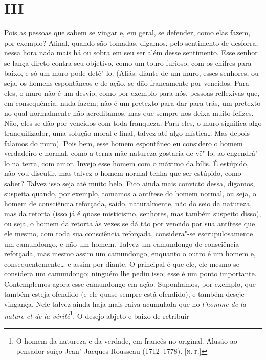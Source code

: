 \section{III}

Pois as pessoas que sabem se vingar e, em geral, se defender, como elas
fazem, por exemplo? Afinal, quando são tomadas, digamos, pelo sentimento
de desforra, nessa hora nada mais há ou sobra em seu ser além desse
sentimento. Esse senhor se lança direto contra seu objetivo, como um
touro furioso, com os chifres para baixo, e só um muro pode detê"-lo.
(Aliás: diante de um muro, esses senhores, ou seja, os homens
espontâneos e de ação, se dão francamente por vencidos. Para eles, o
muro não é um desvio, como por exemplo para nós, pessoas reflexivas que,
em consequência, nada fazem; não é um pretexto para dar para trás, um
pretexto no qual normalmente não acreditamos, mas que sempre nos deixa
muito felizes. Não, eles se dão por vencidos com toda franqueza. Para
eles, o muro significa algo tranquilizador, uma solução moral e final,
talvez até algo mística\ldots{} Mas depois falamos do muro). Pois bem, esse
homem espontâneo eu considero o homem verdadeiro e normal, como a terna
mãe natureza gostaria de vê"-lo, ao engendrá"-lo na terra, com amor.
Invejo esse homem com o máximo da bílis. É estúpido, não vou discutir,
mas talvez o homem normal tenha que ser estúpido, como saber? Talvez
isso seja até muito belo. Fico ainda mais convicto dessa, digamos,
suspeita quando, por exemplo, tomamos a antítese do homem normal, ou
seja, o homem de consciência reforçada, saído, naturalmente, não do seio
da natureza, mas da retorta (isso já é quase misticismo, senhores, mas
também suspeito disso), ou seja, o homem da retorta às vezes se dá tão
por vencido por sua antítese que ele mesmo, com toda sua consciência
reforçada, considera"-se escrupulosamente um camundongo, e não um homem.
Talvez um camundongo de consciência reforçada, mas mesmo assim um
camundongo, enquanto o outro é um homem e, consequentemente\ldots{} e assim
por diante. O principal é que ele, ele mesmo se considera um camundongo;
ninguém lhe pediu isso; esse é um ponto importante. Contemplemos agora
esse camundongo em ação. Suponhamos, por exemplo, que também esteja
ofendido (e ele quase sempre está ofendido), e também deseje vingança.
Nele talvez ainda haja mais raiva acumulada que no \emph{l'homme de la
nature et de la vérité}\footnote{O homem da natureza e da verdade, em
  francês no original. Alusão ao pensador suíço Jean"-Jacques Rousseau
  (1712--1778). {[}\textsc{n.\,t.}{]}}. O desejo abjeto e baixo de retribuir
